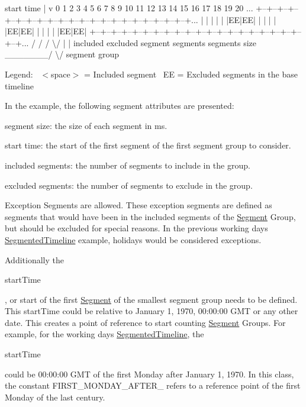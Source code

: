\begin{DoxyPre}
start time
  |
  v
  0  1  2  3  4  5  6  7  8  9 10 11 12 13 14 15 16 17 18 19 20 ...
+--+--+--+--+--+--+--+--+--+--+--+--+--+--+--+--+--+--+--+--+--+...
|  |  |  |  |  |EE|EE|  |  |  |  |  |EE|EE|  |  |  |  |  |EE|EE|
+--+--+--+--+--+--+--+--+--+--+--+--+--+--+--+--+--+--+--+--+--+...
 / /            /
       \textbackslash{}/         |               |
    included   excluded        segment
    segments   segments         size
   \_\_\_\_\_\_\_/
           \textbackslash{}/
      segment group
\end{DoxyPre}
 Legend\+:~\newline
 $<$space$>$ = Included segment~\newline
 EE = Excluded segments in the base timeline~\newline
 

In the example, the following segment attributes are presented\+:


\begin{DoxyItemize}
\item segment size\+: the size of each segment in ms. 
\item start time\+: the start of the first segment of the first segment group to consider. 
\item included segments\+: the number of segments to include in the group. 
\item excluded segments\+: the number of segments to exclude in the group. 
\end{DoxyItemize}

Exception Segments are allowed. These exception segments are defined as segments that would have been in the included segments of the \mbox{\hyperlink{classorg_1_1jfree_1_1chart_1_1axis_1_1_segmented_timeline_1_1_segment}{Segment}} Group, but should be excluded for special reasons. In the previous working days \mbox{\hyperlink{classorg_1_1jfree_1_1chart_1_1axis_1_1_segmented_timeline}{Segmented\+Timeline}} example, holidays would be considered exceptions.

Additionally the
\begin{DoxyCode}
startTime 
\end{DoxyCode}
 , or start of the first \mbox{\hyperlink{classorg_1_1jfree_1_1chart_1_1axis_1_1_segmented_timeline_1_1_segment}{Segment}} of the smallest segment group needs to be defined. This start\+Time could be relative to January 1, 1970, 00\+:00\+:00 G\+MT or any other date. This creates a point of reference to start counting \mbox{\hyperlink{classorg_1_1jfree_1_1chart_1_1axis_1_1_segmented_timeline_1_1_segment}{Segment}} Groups. For example, for the working days \mbox{\hyperlink{classorg_1_1jfree_1_1chart_1_1axis_1_1_segmented_timeline}{Segmented\+Timeline}}, the
\begin{DoxyCode}
startTime 
\end{DoxyCode}
 could be 00\+:00\+:00 G\+MT of the first Monday after January 1, 1970. In this class, the constant F\+I\+R\+S\+T\+\_\+\+M\+O\+N\+D\+A\+Y\+\_\+\+A\+F\+T\+E\+R\+\_ refers to a reference point of the first Monday of the last century.

